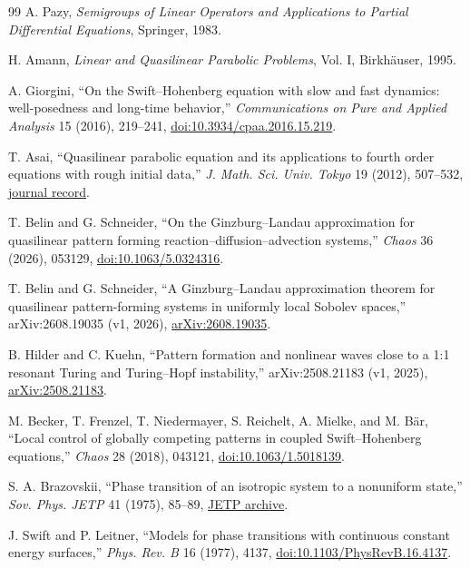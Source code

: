 \documentclass[11pt]{article}
\numberwithin{equation}{section}
\theoremstyle{definition}
\begin{document}
{\footnotesize
\setlength{\emergencystretch}{2em}
\begin{thebibliography}{99}
A. Pazy, \emph{Semigroups of Linear Operators and Applications to Partial
Differential Equations}, Springer, 1983.

H. Amann, \emph{Linear and Quasilinear Parabolic Problems}, Vol. I,
Birkhäuser, 1995.

A. Giorgini, ``On the Swift--Hohenberg equation with slow and fast dynamics:
well-posedness and long-time behavior,'' \emph{Communications on Pure and
Applied Analysis} 15 (2016), 219--241,
\href{https://doi.org/10.3934/cpaa.2016.15.219}{doi:10.3934/cpaa.2016.15.219}.

T. Asai, ``Quasilinear parabolic equation and its applications to fourth
order equations with rough initial data,'' \emph{J. Math. Sci. Univ. Tokyo}
19 (2012), 507--532,
\href{https://www.ms.u-tokyo.ac.jp/journal/abstract_e/jms190402_e.html}{journal record}.

T. Belin and G. Schneider, ``On the Ginzburg--Landau approximation for
quasilinear pattern forming reaction--diffusion--advection systems,''
\emph{Chaos} 36 (2026), 053129,
\href{https://doi.org/10.1063/5.0324316}{doi:10.1063/5.0324316}.

T. Belin and G. Schneider, ``A Ginzburg--Landau approximation theorem for
quasilinear pattern-forming systems in uniformly local Sobolev spaces,''
arXiv:2608.19035 (v1, 2026),
\href{https://arxiv.org/abs/2608.19035}{arXiv:2608.19035}.

B. Hilder and C. Kuehn, ``Pattern formation and nonlinear waves close to a
1:1 resonant Turing and Turing--Hopf instability,'' arXiv:2508.21183 (v1,
2025), \href{https://arxiv.org/abs/2508.21183}{arXiv:2508.21183}.

M. Becker, T. Frenzel, T. Niedermayer, S. Reichelt, A. Mielke, and M. B\"ar,
``Local control of globally competing patterns in coupled Swift--Hohenberg
equations,'' \emph{Chaos} 28 (2018), 043121,
\href{https://doi.org/10.1063/1.5018139}{doi:10.1063/1.5018139}.

S. A. Brazovskii, ``Phase transition of an isotropic system to a nonuniform
state,'' \emph{Sov. Phys. JETP} 41 (1975), 85--89,
\href{https://jetp.ras.ru/cgi-bin/index/r/68/1/p175?a=list}{JETP archive}.

J. Swift and P. Leitner, ``Models for phase transitions with continuous
constant energy surfaces,'' \emph{Phys. Rev. B} 16 (1977), 4137,
\href{https://doi.org/10.1103/PhysRevB.16.4137}{doi:10.1103/PhysRevB.16.4137}.


\end{thebibliography}}
\end{document}
